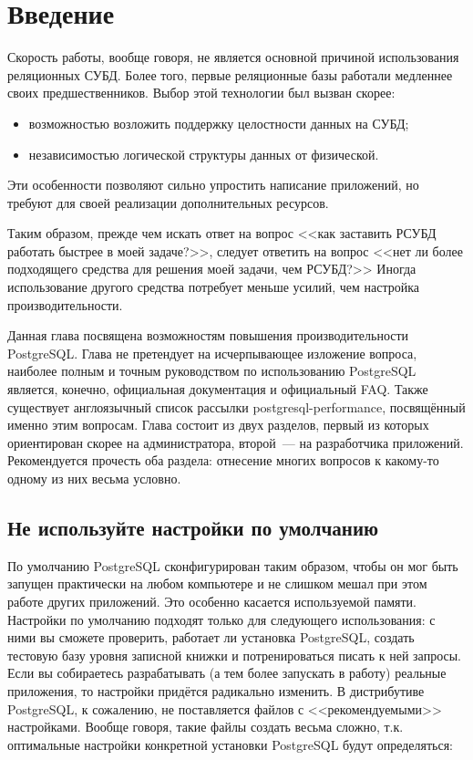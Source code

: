 \section{Введение}
Скорость работы, вообще говоря, не является основной причиной использования реляционных СУБД. Более того, первые реляционные базы работали медленнее своих предшественников. Выбор этой технологии был вызван скорее:

\begin{itemize}
  \item возможностью возложить поддержку целостности данных на СУБД;
  \item независимостью логической структуры данных от физической.
\end{itemize}

Эти особенности позволяют сильно упростить написание приложений, но требуют для своей реализации дополнительных ресурсов.

Таким образом, прежде чем искать ответ на вопрос <<как заставить РСУБД работать быстрее в моей задаче?>>, следует ответить на вопрос <<нет ли более подходящего средства для решения моей задачи, чем РСУБД?>> Иногда использование другого средства потребует меньше усилий, чем настройка производительности.

Данная глава посвящена возможностям повышения производительности PostgreSQL. Глава не претендует на исчерпывающее изложение вопроса, наиболее полным и точным руководством по использованию PostgreSQL является, конечно, официальная документация и официальный FAQ. Также существует англоязычный список рассылки postgresql-performance, посвящённый именно этим вопросам. Глава состоит из двух разделов, первый из которых ориентирован скорее на администратора, второй~--- на разработчика приложений. Рекомендуется прочесть оба раздела: отнесение многих вопросов к какому-то одному из них весьма условно.


\subsection{Не используйте настройки по умолчанию}

По умолчанию PostgreSQL сконфигурирован таким образом, чтобы он мог быть запущен практически на любом компьютере и не слишком мешал при этом работе других приложений. Это особенно касается используемой памяти. Настройки по умолчанию подходят только для следующего использования: с ними вы сможете проверить, работает ли установка PostgreSQL, создать тестовую базу уровня записной книжки и потренироваться писать к ней запросы. Если вы собираетесь разрабатывать (а тем более запускать в работу) реальные приложения, то настройки придётся радикально изменить. В дистрибутиве PostgreSQL, к сожалению, не поставляется файлов с <<рекомендуемыми>> настройками. Вообще говоря, такие файлы создать весьма сложно, т.к. оптимальные настройки конкретной установки PostgreSQL будут определяться:

